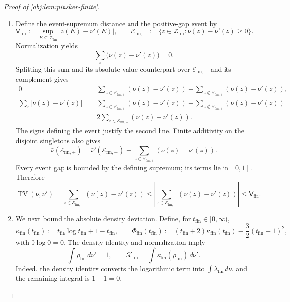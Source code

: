 \documentclass[11pt]{article}
\begin{document}
\begin{proof}[Proof of \cref{obj:lem:pinsker-finite}]
\begin{enumerate}
\item Define the event-supremum distance and the positive-gap event by
\[
\mathsf V_{\mathrm{fin}}
:=\sup_{E\subseteq\mathcal Z_{\mathrm{fin}}}
  |\bar\nu(E)-\bar\nu'(E)|,
\qquad
\mathcal E_{\mathrm{fin},+}
:=\{z\in\mathcal Z_{\mathrm{fin}}:\nu(z)-\nu'(z)\ge0\}.
\]
Normalization yields
\[
\sum_z\bigl(\nu(z)-\nu'(z)\bigr)=0.
\]
Splitting this sum and its absolute-value counterpart over
\(\mathcal E_{\mathrm{fin},+}\) and its complement gives
\[
\begin{aligned}
0
&=\sum_{z\in\mathcal E_{\mathrm{fin},+}}(\nu(z)-\nu'(z))
 +\sum_{z\notin\mathcal E_{\mathrm{fin},+}}(\nu(z)-\nu'(z)),\\
\sum_z|\nu(z)-\nu'(z)|
&=\sum_{z\in\mathcal E_{\mathrm{fin},+}}(\nu(z)-\nu'(z))
 -\sum_{z\notin\mathcal E_{\mathrm{fin},+}}(\nu(z)-\nu'(z))\\
&=2\sum_{z\in\mathcal E_{\mathrm{fin},+}}(\nu(z)-\nu'(z)).
\end{aligned}
\]
The signs defining the event justify the second line. Finite additivity on the disjoint singletons also gives
\[
\bar\nu(\mathcal E_{\mathrm{fin},+})
-\bar\nu'(\mathcal E_{\mathrm{fin},+})
=\sum_{z\in\mathcal E_{\mathrm{fin},+}}(\nu(z)-\nu'(z)).
\]
Every event gap is bounded by the defining supremum; its terms lie in \([0,1]\). Therefore
\[
\operatorname{TV}(\nu,\nu')
=\sum_{z\in\mathcal E_{\mathrm{fin},+}}(\nu(z)-\nu'(z))
\le
\left|\sum_{z\in\mathcal E_{\mathrm{fin},+}}(\nu(z)-\nu'(z))\right|
\le\mathsf V_{\mathrm{fin}}.
\]

\item We next bound the absolute density deviation. Define, for \(t_{\mathrm{fin}}\in[0,\infty)\),
\[
\kappa_{\mathrm{fin}}(t_{\mathrm{fin}})
:=t_{\mathrm{fin}}\log t_{\mathrm{fin}}+1-t_{\mathrm{fin}},
\qquad
\Phi_{\mathrm{fin}}(t_{\mathrm{fin}})
:=(t_{\mathrm{fin}}+2)\kappa_{\mathrm{fin}}(t_{\mathrm{fin}})
-\frac32(t_{\mathrm{fin}}-1)^2,
\]
with \(0\log0=0\). The density identity and normalization imply
\[
\int\rho_{\mathrm{fin}}\,d\bar\nu'=1,
\qquad
\mathcal K_{\mathrm{fin}}
=\int\kappa_{\mathrm{fin}}(\rho_{\mathrm{fin}})\,d\bar\nu'.
\]
Indeed, the density identity converts the logarithmic term into
\(\int\lambda_{\mathrm{fin}}\,d\bar\nu\), and the remaining integral is \(1-1=0\).


\end{enumerate}
\end{proof}
\end{document}
